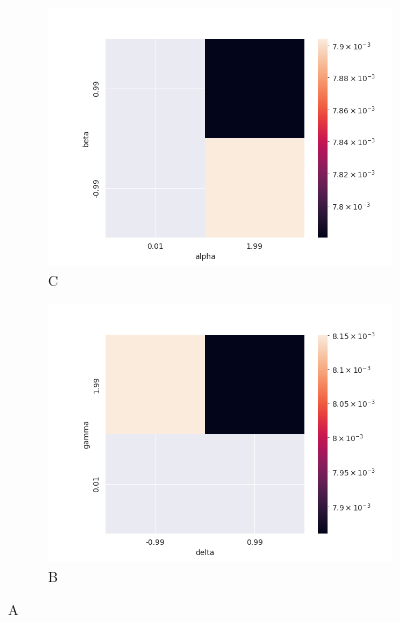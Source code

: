 \documentclass{article}
\begin{document}
		\begin{figure}[H]
			\begin{subfigure}{.5\textwidth}
				\centering
				\includegraphics[width=1\linewidth]{images/heatmap_cf_MSE_alpha_beta.png}
				\caption{C}
			\end{subfigure}
			\begin{subfigure}[r]{.5\textwidth}
				\centering
				\includegraphics[width=1\linewidth]{images/heatmap_cf_MSE_gamma_delta.png}
				\caption{B}
			\end{subfigure}
			\caption{A}
		\end{figure}
\end{document}
